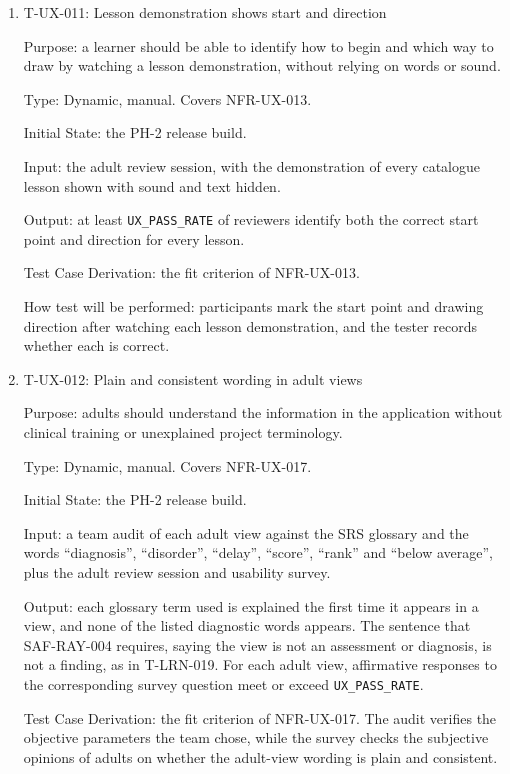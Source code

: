 \documentclass[12pt, titlepage]{article}
\newcommand{\testitem}[1]{\item #1\par\nopagebreak}
\begin{document}
\begin{enumerate}
Test Case Derivation: the fit criteria of NFR-UX-010 and NFR-UX-011.

How test will be performed: Playwright checks the persisted settings and
saved strokes; a tester confirms audio playback and the per-child behaviour on
the iPad.

\testitem{T-UX-011: Lesson demonstration shows start and direction}

Purpose: a learner should be able to identify how to begin and which way to
draw by watching a lesson demonstration, without relying on words or sound.

Type: Dynamic, manual. Covers NFR-UX-013.

Initial State: the PH-2 release build. 

Input: the adult review session, with the demonstration of every catalogue lesson
shown with sound and text hidden.

Output: at least \texttt{UX\_PASS\_RATE} of reviewers identify both the
correct start point and direction for every lesson.

Test Case Derivation: the fit criterion of NFR-UX-013.

How test will be performed: participants mark the start point and drawing
direction after watching each lesson demonstration, and the tester records
whether each is correct.

\testitem{T-UX-012: Plain and consistent wording in adult views}

Purpose: adults should understand the information in the application
without clinical training or unexplained project terminology.

Type: Dynamic, manual. Covers NFR-UX-017.

Initial State: the PH-2 release build.

Input: a team audit of each adult view against the SRS glossary and the words
``diagnosis'', ``disorder'', ``delay'', ``score'', ``rank'' and ``below average'',
plus the adult review session and usability survey.

Output: each glossary term used is explained the first time it appears in a
view, and none of the listed diagnostic words appears. The sentence that
SAF-RAY-004 requires, saying the view is not an assessment or diagnosis, is not a
finding, as in T-LRN-019. For each adult view, affirmative responses to the
corresponding survey question meet or exceed \texttt{UX\_PASS\_RATE}. 

Test Case Derivation: the fit criterion of NFR-UX-017. The audit verifies the objective parameters the team chose, while the survey
checks the subjective opinions of adults on whether the adult-view wording is
plain and consistent.


\end{enumerate}
\end{document}
